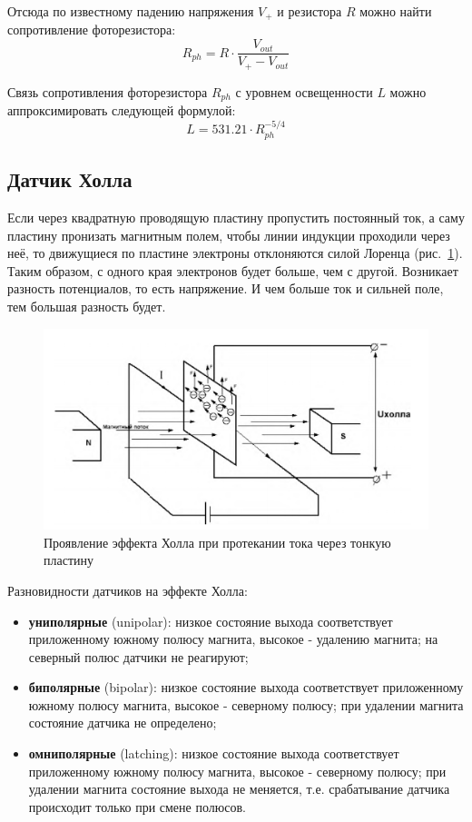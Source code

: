 \documentclass[12pt]{article}
\begin{document}
Отсюда по известному падению напряжения \(V_{+}\) и резистора \(R\) можно найти сопротивление фоторезистора:
\[
    R_{ph} = R \cdot \frac{V_{out}}{V_{+}-V_{out}}
\]

Связь сопротивления фоторезистора \(R_{ph}\) с уровнем освещенности \(L\) можно аппроксимировать следующей формулой:
\[
    L = 531.21 \cdot R_{ph}^{-5/4}
\]

\subsection{Датчик Холла}

Если через квадратную проводящую пластину пропустить постоянный ток, а саму пластину пронизать магнитным полем, чтобы линии индукции проходили через неё, то движущиеся по пластине электроны отклоняются силой Лоренца (рис.~\ref{halleff}). Таким образом, с одного края электронов будет больше, чем с другой. Возникает разность потенциалов, то есть напряжение. И чем больше ток и сильней поле, тем большая разность будет.

\begin{figure}[H]
    \centering
    \includegraphics[scale=0.7]{images/hall-effect.png}
    \caption{Проявление эффекта Холла при протекании тока через тонкую
    пластину}\label{halleff}
\end{figure}

Разновидности датчиков на эффекте Холла:
\begin{itemize}
    \item
          \textbf{униполярные} (unipolar): низкое состояние выхода соответствует приложенному южному полюсу магнита, высокое - удалению магнита; на северный полюс датчики не реагируют;
    \item
          \textbf{биполярные} (bipolar): низкое состояние выхода соответствует приложенному южному полюсу магнита, высокое - северному полюсу; при удалении магнита состояние датчика не определено;
    \item
          \textbf{омниполярные} (latching): низкое состояние выхода соответствует приложенному южному полюсу магнита, высокое - северному полюсу; при удалении магнита состояние выхода не меняется, т.е. срабатывание датчика происходит только при смене полюсов.
\end{itemize}
\end{document}
